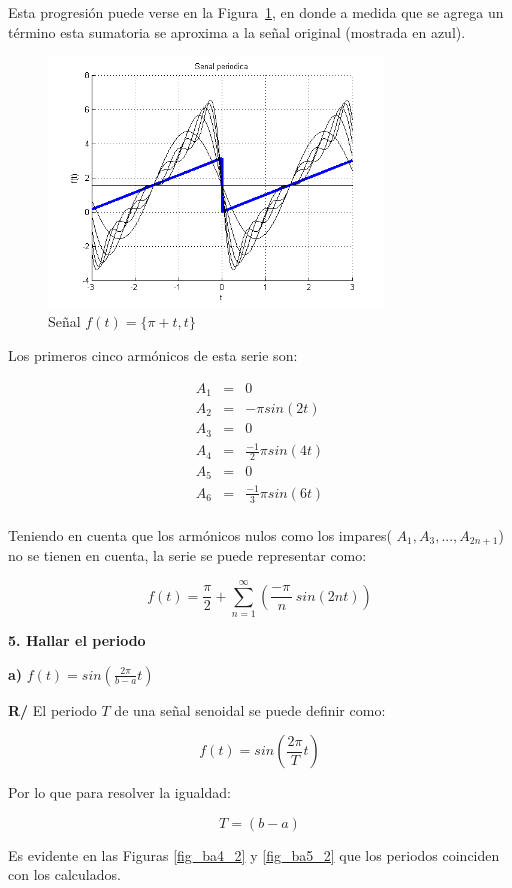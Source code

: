 \documentclass[twocolumn]{article}
\begin{document}
Esta progresión puede verse en la Figura~\ref{fig_1d}, en donde a medida que se agrega un término esta sumatoria se aproxima a la señal original (mostrada en azul).

\begin{figure}[!t]
\centering
\includegraphics[width=3.5in]{imgs/piece.png}
\caption{Señal $f(t) = \{ \pi +t, t \}$}
\label{fig_1d}
\end{figure}

Los primeros cinco armónicos de esta serie son:

\begin{eqnarray*}
A_1 &=& 0 \\
A_2 &=& -\pi sin(2t) \\
A_3 &=& 0 \\
A_4 &=& \frac{-1}{2}\pi sin(4t) \\
A_5 &=& 0 \\
A_6 &=& \frac{-1}{3}\pi sin(6t) \\
\end{eqnarray*}

Teniendo en cuenta que los armónicos nulos como los impares( $A_1 , A_3,..., A_{2n+1}$) no se tienen en cuenta, la serie se puede representar como:

$$f(t) = \frac{\pi}{2} + \sum_{n=1}^\infty\left( \frac{ -\pi \,}{n} \,sin(2 n t) \right)$$



\textbf{5. Hallar el periodo}

\textbf{a)} $f(t) = sin(\frac{2\pi}{b-a}t)$

\textbf{R/} El periodo $T$ de una señal senoidal se puede definir como:

$$f(t) = sin\left(\frac{2\pi}{T}t\right)$$

Por lo que para resolver la igualdad:

$$T = (b - a)$$

Es evidente en las Figuras \ref{fig_ba4_2} y \ref{fig_ba5_2} que los periodos coinciden con los calculados.
\end{document}

